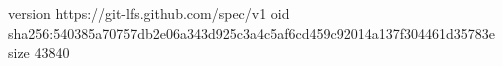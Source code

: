 version https://git-lfs.github.com/spec/v1
oid sha256:540385a70757db2e06a343d925c3a4c5af6cd459c92014a137f304461d35783e
size 43840
